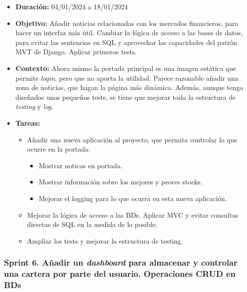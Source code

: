 \begin{itemize}
\item  
\textbf{Duración:} 04/01/2024 a 18/01/2024

\item
\textbf{Objetivo:} Añadir noticias relacionadas con los mercados financieros, para hacer un interfaz más útil. Cambiar la lógica de acceso a las bases de datos, para evitar las sentencias en SQL y aprovechar las capacidades del patrón MVT\citep{online:django_MVT_2} de Django. Aplicar primeros tests. 

\item
\textbf{Contexto:} Ahora mismo la portada principal es una imagen estática que permite \emph{login}, pero que no aporta la utilidad. Parece razonable añadir una zona de noticias, que hagan la página más dinámica. Además, aunque tengo diseñados unos pequeños tests, se tiene que mejorar toda la estructura de \emph{testing} y \emph{log}. 

\item
\textbf{Tareas:}
	\begin{itemize}
	\tightlist
	\item 
	Añadir una nueva aplicación al proyecto, que permita controlar lo que ocurre en la portada:
		\begin{itemize}
		\tightlist
		\item
		Mostrar noticas en portada.
		\item
		Mostrar información sobre los mejores y peores stocks.
		\item
		Mejorar el logging para lo que ocurra en esta nueva aplicación.
		\end{itemize}
	\item
	Mejorar la lógica de acceso a las BDs. Aplicar MVC y evitar consultas directas de SQL en la medida de lo posible.
	\item 	
	Ampliar los tests y mejorar la estructura de testing. 
  	\end{itemize}
\end{itemize}


\subsubsection{Sprint 6. Añadir un \emph{dashboard} para almacenar y controlar una cartera por parte del usuario. Operaciones CRUD en BDs}


